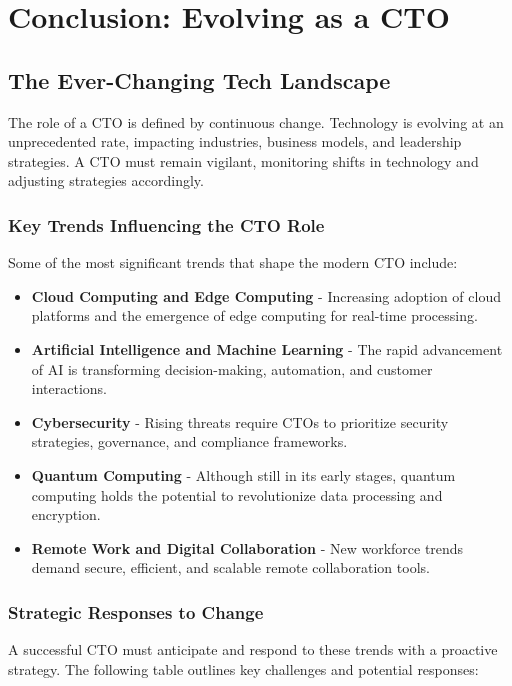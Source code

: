 \chapter{Conclusion: Evolving as a CTO}

\section{The Ever-Changing Tech Landscape}

The role of a CTO is defined by continuous change. Technology is evolving at an unprecedented rate, impacting industries, business models, and leadership strategies. A CTO must remain vigilant, monitoring shifts in technology and adjusting strategies accordingly.

\subsection{Key Trends Influencing the CTO Role}

Some of the most significant trends that shape the modern CTO include:

\begin{itemize}
    \item \textbf{Cloud Computing and Edge Computing} - Increasing adoption of cloud platforms and the emergence of edge computing for real-time processing.
    \item \textbf{Artificial Intelligence and Machine Learning} - The rapid advancement of AI is transforming decision-making, automation, and customer interactions.
    \item \textbf{Cybersecurity} - Rising threats require CTOs to prioritize security strategies, governance, and compliance frameworks.
    \item \textbf{Quantum Computing} - Although still in its early stages, quantum computing holds the potential to revolutionize data processing and encryption.
    \item \textbf{Remote Work and Digital Collaboration} - New workforce trends demand secure, efficient, and scalable remote collaboration tools.
\end{itemize}

\subsection{Strategic Responses to Change}

A successful CTO must anticipate and respond to these trends with a proactive strategy. The following table outlines key challenges and potential responses:

